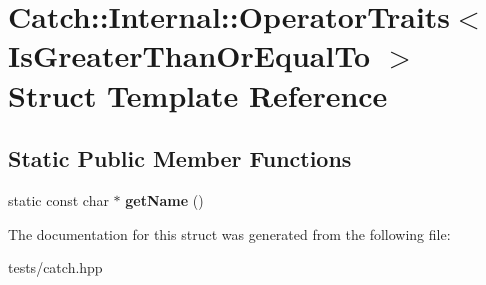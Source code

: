 \hypertarget{struct_catch_1_1_internal_1_1_operator_traits_3_01_is_greater_than_or_equal_to_01_4}{}\section{Catch\+:\+:Internal\+:\+:Operator\+Traits$<$ Is\+Greater\+Than\+Or\+Equal\+To $>$ Struct Template Reference}
\label{struct_catch_1_1_internal_1_1_operator_traits_3_01_is_greater_than_or_equal_to_01_4}
\subsection*{Static Public Member Functions}
\begin{DoxyCompactItemize}
\item 
\mbox{\label{struct_catch_1_1_internal_1_1_operator_traits_3_01_is_greater_than_or_equal_to_01_4_a76b6f6b0dbaf7d19ebb1b4b4891e719e}} 
static const char $\ast$ {\bfseries get\+Name} ()
\end{DoxyCompactItemize}


The documentation for this struct was generated from the following file\+:\begin{DoxyCompactItemize}
\item 
tests/catch.\+hpp\end{DoxyCompactItemize}
